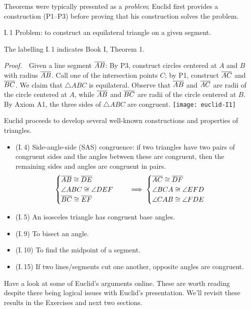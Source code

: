 
Theorems were typically presented as a \emph{problem}; Euclid first provides a construction (P1--P3) before proving that his construction solves the problem.

\begin{thm}{I.\,1}{}
	Problem: to construct an equilateral triangle on a given segment.
\end{thm}

The labelling I.\,1 indicates Book I, Theorem 1.

\begin{tcolorbox}[proofstyle, lower separated=false, sidebyside, sidebyside align=top seam, sidebyside gap=0pt, righthand width=0.35\linewidth]
	\emph{Proof.}\ \ Given a line segment $\overline{AB}$:\smallbreak
	By P3, construct circles centered at $A$ and $B$ with radius $\overline{AB}$.\smallbreak
	Call one of the intersection points $C$; by P1, construct $\overline{AC}$ and $\overline{BC}$.\smallbreak
	We claim that $\triangle ABC$ is equilateral.\medbreak
	Observe that $\overline{AB}$ and $\overline{AC}$ are radii of the circle centered at $A$, while $\overline{AB}$ and $\overline{BC}$ are radii of the circle centered at $B$. By Axiom A1, the three sides of $\triangle ABC$ are congruent.
	\tcblower
	\flushright\texttt{[image: euclid-I1]}\hfil\qedsymbol
\end{tcolorbox}


Euclid proceeds to develop several well-known constructions and properties of triangles.
\begin{itemize}\itemsep0pt
  \item (I.\,4) Side-angle-side (SAS) congruence: if two triangles have two pairs of congruent sides and the angles between these are congruent, then the remaining sides and angles are congruent in pairs.
  \[
  	\begin{cases}
		  \overline{AB}\cong\overline{DE}\\
		  \angle ABC\cong\angle DEF\\
		  \overline{BC}\cong\overline{EF}
 	 	\end{cases}
  	\quad\implies
  	\begin{cases}
		  \overline{AC}\cong\overline{DF}\\
		  \angle BCA\cong\angle EFD\\
		  \angle CAB\cong\angle FDE
  	\end{cases}
  \]
  \item (I.\,5) An isosceles triangle has congruent base angles.
  \item (I.\,9) To bisect an angle.
  \item (I.\,10) To find the midpoint of a segment.
  \item (I.\,15) If two lines/segments cut one another, opposite angles are congruent.
\end{itemize}
Have a look at some of Euclid's arguments online. These are worth reading despite there being logical issues with Euclid's presentation. We'll revisit these results in the Exercises and next two sections. 

